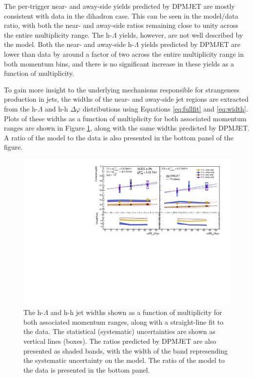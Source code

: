 The per-trigger near- and away-side yields predicted by DPMJET are mostly consistent with data in the dihadron case. This can be seen in the model/data ratio, with both the near- and away-side ratios remaining close to unity across the entire multiplicity range. The h-$\Lambda$ yields, however, are not well described by the model. Both the near- and away-side h-$\Lambda$ yields predicted by DPMJET are lower than data by around a factor of two across the entire multiplicity range in both momentum bins, and there is no significant increase in these yields as a function of multiplicity. 

To gain more insight to the underlying mechanisms responsible for strangeness production in jets, the widths of the near- and away-side jet regions are extracted from the h-$\Lambda$ and h-h $\Delta\varphi$ distributions using Equations \ref{eq:fullfit} and \ref{eq:width}. Plots of these widths as a function of multiplicity for both associated momentum ranges are shown in Figure \ref{fig:jet_widths}, along with the same widths predicted by DPMJET. A ratio of the model to the data is also presented in the bottom panel of the figure.

\begin{figure}[h!]
\centering
\includegraphics[width=\textwidth]{figures/results/final_width_plot_new_x_axis_model_ratio.pdf}
\caption{The h-$\Lambda$ and h-h jet widths shown as a function of multiplicity for both associated momentum ranges, along with a straight-line fit to the data. The statistical (systematic) uncertainties are shown as vertical lines (boxes). The ratios predicted by DPMJET are also presented as shaded bands, with the width of the band represending the systematic uncertainty on the model. The ratio of the model to the data is presented in the bottom panel.}
\label{fig:jet_widths}
\end{figure}


